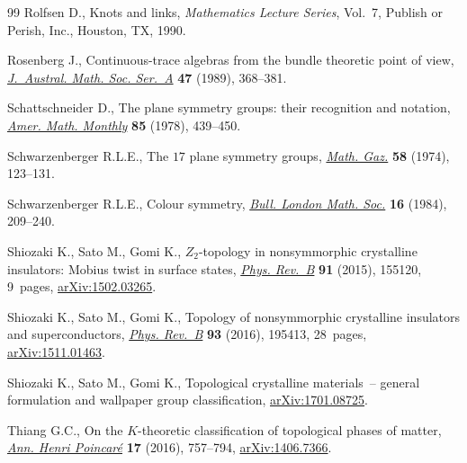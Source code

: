 \documentclass[pdftex]{sigma}
\theoremstyle{definition}
\begin{document}
\begin{thebibliography}{99}
Rolfsen D., Knots and links, \textit{Mathematics Lecture Series}, Vol.~7,
 Publish or Perish, Inc., Houston, TX, 1990.

Rosenberg J., Continuous-trace algebras from the bundle theoretic point of
 view, \href{https://doi.org/10.1017/S1446788700033097}{\textit{J.~Austral. Math. Soc. Ser.~A}} \textbf{47} (1989), 368--381.

Schattschneider D., The plane symmetry groups: their recognition and notation,
 \href{https://doi.org/10.2307/2320063}{\textit{Amer. Math. Monthly}} \textbf{85} (1978), 439--450.

Schwarzenberger R.L.E., The {$17$} plane symmetry groups, \href{https://doi.org/10.2307/3617798}{\textit{Math. Gaz.}}
 \textbf{58} (1974), 123--131.

Schwarzenberger R.L.E., Colour symmetry, \href{https://doi.org/10.1112/blms/16.3.209}{\textit{Bull. London Math. Soc.}}
 \textbf{16} (1984), 209--240.

Shiozaki K., Sato M., Gomi K., $Z_2$-topology in nonsymmorphic crystalline
 insulators: {M}obius twist in surface states, \href{https://doi.org/10.1103/PhysRevB.91.155120}{\textit{Phys. Rev.~B}}
 \textbf{91} (2015), 155120, 9~pages, \href{http://arxiv.org/abs/1502.03265}{arXiv:1502.03265}.

Shiozaki K., Sato M., Gomi K., Topology of nonsymmorphic crystalline insulators
 and superconductors, \href{https://doi.org/10.1103/PhysRevB.93.195413}{\textit{Phys. Rev.~B}} \textbf{93} (2016), 195413,
 28~pages, \href{http://arxiv.org/abs/1511.01463}{arXiv:1511.01463}.

Shiozaki K., Sato M., Gomi K., Topological crystalline materials~-- general
 formulation and wallpaper group classif\/ication, \href{http://arxiv.org/abs/1701.08725}{arXiv:1701.08725}.

Thiang G.C., On the {$K$}-theoretic classif\/ication of topological phases of
 matter, \href{https://doi.org/10.1007/s00023-015-0418-9}{\textit{Ann. Henri Poincar\'e}} \textbf{17} (2016), 757--794,
 \href{http://arxiv.org/abs/1406.7366}{arXiv:1406.7366}.

\end{thebibliography}\LastPageEnding
\end{document}

